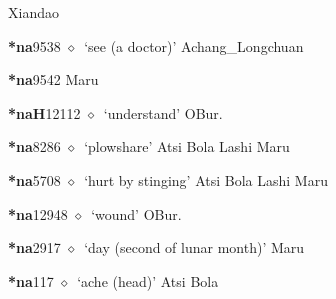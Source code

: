 \begin{list}{}{\leftmargin=1.5em \itemindent=-1.5em}
         Xiandao 
  \item {\footnotesize \textbf{*na}}{\tiny 9538}
\hspace{1ex}
         $\diamond$~`see (a doctor)'
         Achang\_Longchuan 
  \item {\footnotesize \textbf{*na}}{\tiny 9542}
\hspace{1ex}
         Maru 
  \item {\footnotesize \textbf{*naH}}{\tiny 12112}
\hspace{1ex}
         $\diamond$~`understand'
         OBur. 
  \item {\footnotesize \textbf{*na}}{\tiny 8286}
\hspace{1ex}
         $\diamond$~`plowshare'
         Atsi 
\hspace{1ex}
         Bola 
\hspace{1ex}
         Lashi 
\hspace{1ex}
         Maru 
  \item {\footnotesize \textbf{*na}}{\tiny 5708}
\hspace{1ex}
         $\diamond$~`hurt by stinging'
         Atsi 
\hspace{1ex}
         Bola 
\hspace{1ex}
         Lashi 
\hspace{1ex}
         Maru 
  \item {\footnotesize \textbf{*na}}{\tiny 12948}
\hspace{1ex}
         $\diamond$~`wound'
         OBur. 
  \item {\footnotesize \textbf{*na}}{\tiny 2917}
\hspace{1ex}
         $\diamond$~`day (second of lunar month)'
         Maru 
  \item {\footnotesize \textbf{*na}}{\tiny 117}
\hspace{1ex}
         $\diamond$~`ache (head)'
         Atsi 
\hspace{1ex}
         Bola 

\end{list}

